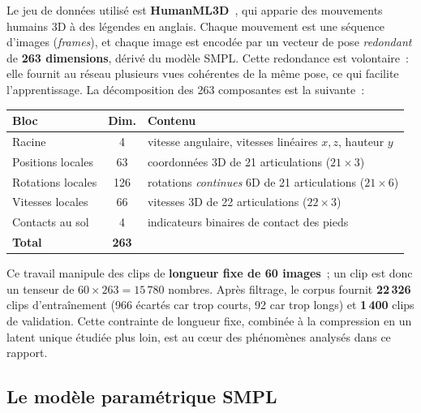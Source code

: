 \documentclass[12pt,a4paper,oneside]{report}
\theoremstyle{definition}
\theoremstyle{plain}
\begin{document}
Le jeu de données utilisé est \textbf{HumanML3D}~\cite{guo2022humanml3d}, qui
apparie des mouvements humains 3D à des légendes en anglais. Chaque mouvement est
une séquence d'images (\emph{frames}), et chaque image est encodée par un vecteur
de pose \emph{redondant} de \textbf{263 dimensions}, dérivé du modèle SMPL. Cette
redondance est volontaire~: elle fournit au réseau plusieurs vues cohérentes de
la même pose, ce qui facilite l'apprentissage. La décomposition des 263
composantes est la suivante~:

\begin{center}
\setlength{\tabcolsep}{10pt}
\begin{tabular}{@{}lcp{6.6cm}@{}}
\toprule
\textbf{Bloc} & \textbf{Dim.} & \textbf{Contenu} \\
\midrule
Racine & 4 & vitesse angulaire, vitesses linéaires $x,z$, hauteur $y$ \\
Positions locales & 63 & coordonnées 3D de 21 articulations ($21\times3$) \\
Rotations locales & 126 & rotations \emph{continues} 6D de 21 articulations ($21\times6$) \\
Vitesses locales & 66 & vitesses 3D de 22 articulations ($22\times3$) \\
Contacts au sol & 4 & indicateurs binaires de contact des pieds \\
\midrule
\textbf{Total} & \textbf{263} & \\
\bottomrule
\end{tabular}
\end{center}

Ce travail manipule des clips de \textbf{longueur fixe de 60 images}~; un clip est
donc un tenseur de $60\times263 = 15\,780$ nombres. Après filtrage, le corpus
fournit \textbf{22\,326} clips d'entraînement (966 écartés car trop courts, 92 car
trop longs) et \textbf{1\,400} clips de validation. Cette contrainte de longueur
fixe, combinée à la compression en un latent unique étudiée plus loin, est au
cœur des phénomènes analysés dans ce rapport.

\subsection{Le modèle paramétrique SMPL}
\label{sub:smpl}
\end{document}

